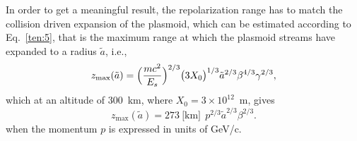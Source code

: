 \documentclass [12pt,a4paper,     ]{report} %
\begin{document}
   In order to get a meaningful result, the repolarization range has to match the collision driven expansion of the plasmoid, which can be estimated according to Eq.~\eqref{ten:5}, that is the maximum range at which the plasmoid streams have expanded to a radius $\tilde{a}$, i.e.,
%
\begin{equation}\label{gau:16} %
           z_{\text{max}}({\tilde{a}})
                   = \Bigl(\frac{mc^2}{E_s}\Bigr)^{2/3} \bigl(3X_0\bigr)^{1/3}
                     \tilde{a}^{2/3}
                     \beta^{4/3}\gamma^{2/3},
\end{equation}
%
which at an altitude of 300~km, where $X_0=3 \times 10^{12}$~m, gives
%
\begin{equation}\label{gau:17} %
    z_{\text{max}}({\tilde{a}}) =  273 ~ \text{[km]} ~~ p^{2/3}
                     \tilde{a}^{2/3}
                     \beta^{2/3}.
\end{equation}
%
when the momentum $p$ is expressed in units of GeV/c.
\end{document}
